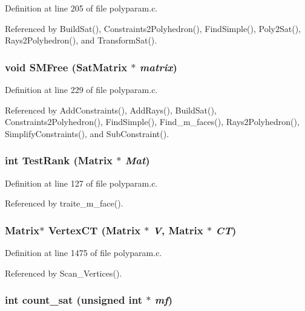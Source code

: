Definition at line 205 of file polyparam.c.

Referenced by Build\-Sat(), Constraints2Polyhedron(), Find\-Simple(), Poly2Sat(), Rays2Polyhedron(), and Transform\-Sat().

\subsubsection{\setlength{\rightskip}{0pt plus 5cm}void SMFree ({\bf Sat\-Matrix} $\ast$ {\em matrix})\hspace{0.3cm}{\tt  [static]}}\label{polyparam_8c_a24}




Definition at line 229 of file polyparam.c.

Referenced by Add\-Constraints(), Add\-Rays(), Build\-Sat(), Constraints2Polyhedron(), Find\-Simple(), Find\_\-m\_\-faces(), Rays2Polyhedron(), Simplify\-Constraints(), and Sub\-Constraint().

\subsubsection{\setlength{\rightskip}{0pt plus 5cm}int Test\-Rank (Matrix $\ast$ {\em Mat})\hspace{0.3cm}{\tt  [static]}}\label{polyparam_8c_a22}




Definition at line 127 of file polyparam.c.

Referenced by traite\_\-m\_\-face().

\subsubsection{\setlength{\rightskip}{0pt plus 5cm}Matrix$\ast$ Vertex\-CT (Matrix $\ast$ {\em V}, Matrix $\ast$ {\em CT})}\label{polyparam_8c_a38}




Definition at line 1475 of file polyparam.c.

Referenced by Scan\_\-Vertices().

\subsubsection{\setlength{\rightskip}{0pt plus 5cm}int count\_\-sat (unsigned int $\ast$ {\em mf})\hspace{0.3cm}{\tt  [static]}}\label{polyparam_8c_a27}




